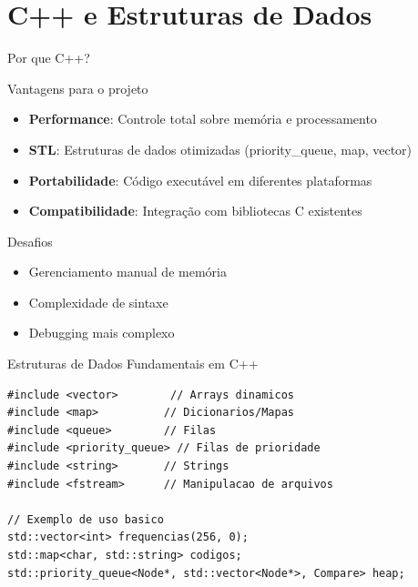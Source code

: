 \documentclass{beamer}
\begin{document}
\section{C++ e Estruturas de Dados}
\begin{frame}{Por que C++?}
    \begin{block}{Vantagens para o projeto}
        \begin{itemize}
            \item \textbf{Performance}: Controle total sobre memória e processamento
            \item \textbf{STL}: Estruturas de dados otimizadas (priority\_queue, map, vector)
            \item \textbf{Portabilidade}: Código executável em diferentes plataformas
            \item \textbf{Compatibilidade}: Integração com bibliotecas C existentes
        \end{itemize}
    \end{block}
    \begin{alertblock}{Desafios}
        \begin{itemize}
            \item Gerenciamento manual de memória
            \item Complexidade de sintaxe
            \item Debugging mais complexo
        \end{itemize}
    \end{alertblock}
\end{frame}

\begin{frame}[fragile]{Estruturas de Dados Fundamentais em C++}
    \begin{lstlisting}[style=CStyle, caption=Principais estruturas utilizadas]
#include <vector>        // Arrays dinamicos
#include <map>          // Dicionarios/Mapas
#include <queue>        // Filas
#include <priority_queue> // Filas de prioridade
#include <string>       // Strings
#include <fstream>      // Manipulacao de arquivos

// Exemplo de uso basico
std::vector<int> frequencias(256, 0);
std::map<char, std::string> codigos;
std::priority_queue<Node*, std::vector<Node*>, Compare> heap;
    \end{lstlisting}
\end{frame}
\end{document}
